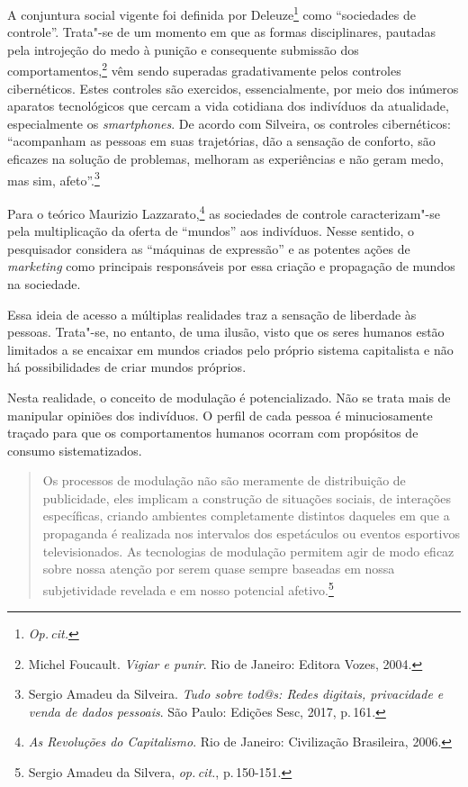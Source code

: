 A conjuntura social vigente foi definida por Deleuze\footnote{\textit{Op.\,cit.}} como
``sociedades de controle''. Trata"-se de um momento em que as formas
disciplinares, pautadas pela introjeção do medo à punição e consequente
submissão dos comportamentos,\footnote{Michel Foucault. \emph{Vigiar e punir}. Rio de Janeiro: Editora Vozes, 2004.} vêm sendo superadas
gradativamente pelos controles cibernéticos. Estes controles são
exercidos, essencialmente, por meio dos inúmeros aparatos tecnológicos
que cercam a vida cotidiana dos indivíduos da atualidade, especialmente
os \emph{smartphones}. De acordo com Silveira, os
controles cibernéticos: ``acompanham as pessoas em suas trajetórias, dão
a sensação de conforto, são eficazes na solução de problemas, melhoram
as experiências e não geram medo, mas sim, afeto''.\footnote{Sergio Amadeu da Silveira. \emph{Tudo sobre tod@s: Redes digitais, privacidade e venda de dados pessoais}. São Paulo: Edições Sesc, 2017, p.\,161.}

Para o teórico Maurizio Lazzarato,\footnote{\emph{As Revoluções do Capitalismo}. Rio de
Janeiro: Civilização Brasileira, 2006.} as sociedades de controle
caracterizam"-se pela multiplicação da oferta de ``mundos'' aos
indivíduos. Nesse sentido, o pesquisador considera as ``máquinas de
expressão'' e as potentes ações de \emph{marketing} como principais
responsáveis por essa criação e propagação de mundos na sociedade.

Essa ideia de acesso a múltiplas realidades traz a sensação de liberdade
às pessoas. Trata"-se, no entanto, de uma ilusão, visto que os seres
humanos estão limitados a se encaixar em mundos criados pelo próprio
sistema capitalista e não há possibilidades de criar mundos próprios.

Nesta realidade, o conceito de modulação é potencializado. Não se trata
mais de manipular opiniões dos indivíduos. O perfil de cada pessoa é
minuciosamente traçado para que os comportamentos humanos ocorram com
propósitos de consumo sistematizados.

\begin{quote}
Os processos de modulação não são meramente de distribuição de
publicidade, eles implicam a construção de situações sociais, de
interações específicas, criando ambientes completamente distintos
daqueles em que a propaganda é realizada nos intervalos dos espetáculos
ou eventos esportivos televisionados. As tecnologias de modulação
permitem agir de modo eficaz sobre nossa atenção por serem quase sempre
baseadas em nossa subjetividade revelada e em nosso potencial afetivo.\footnote{Sergio Amadeu da Silvera, \textit{op.\,cit.}, p.\,150-151.}
\end{quote}

